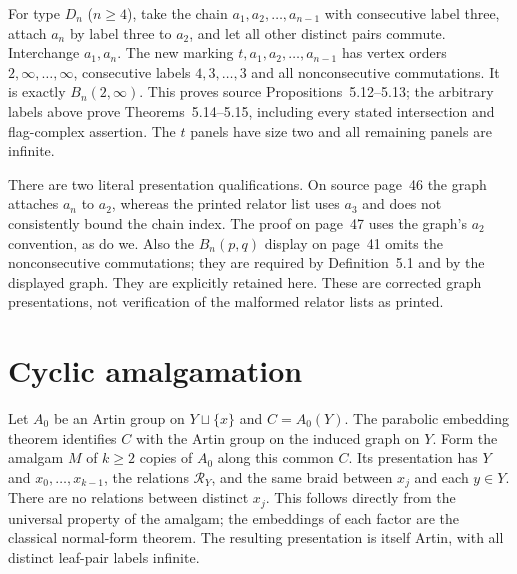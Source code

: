 For type $D_n$ ($n\geq4$), take the chain $a_1,a_2,\ldots,a_{n-1}$
with consecutive label three, attach $a_n$ by label three to $a_2$,
and let all other distinct pairs commute. Interchange $a_1,a_n$.
The new marking $t,a_1,a_2,\ldots,a_{n-1}$ has vertex orders
$2,\infty,\ldots,\infty$, consecutive labels $4,3,\ldots,3$ and
all nonconsecutive commutations. It is exactly $B_n(2,\infty)$.
This proves source Propositions~5.12--5.13; the arbitrary labels above
prove Theorems~5.14--5.15, including every stated intersection and
flag-complex assertion. The $t$ panels have size two and all remaining
panels are infinite.

There are two literal presentation qualifications. On source page~46
the graph attaches $a_n$ to $a_2$, whereas the printed relator list
uses $a_3$ and does not consistently bound the chain index. The proof
on page~47 uses the graph's $a_2$ convention, as do we. Also the
$B_n(p,q)$ display on page~41 omits the nonconsecutive commutations;
they are required by Definition~5.1 and by the displayed graph. They
are explicitly retained here. These are corrected graph presentations,
not verification of the malformed relator lists as printed.

\section{Cyclic amalgamation}
Let $A_0$ be an Artin group on $Y\sqcup\{x\}$ and
$C=A_0(Y)$. The parabolic embedding theorem identifies $C$ with the
Artin group on the induced graph on $Y$. Form the amalgam $M$ of
$k\geq2$ copies of $A_0$ along this common $C$. Its presentation has
$Y$ and $x_0,\ldots,x_{k-1}$, the relations $\mathcal R_Y$, and the
same braid between $x_j$ and each $y\in Y$. There are no relations
between distinct $x_j$. This follows directly from the universal
property of the amalgam; the embeddings of each factor are the
classical normal-form theorem. The resulting presentation is itself
Artin, with all distinct leaf-pair labels infinite.

